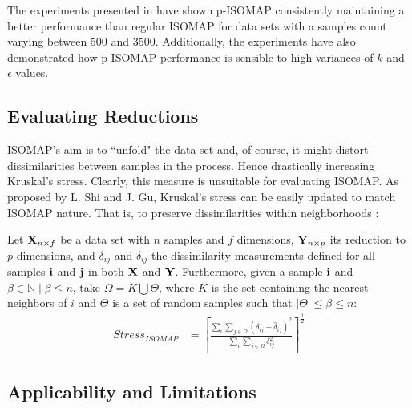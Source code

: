 The experiments presented in \cite{choo2010p} have shown p-ISOMAP consistently maintaining a better performance than regular ISOMAP for data sets with a samples count varying between 500 and 3500. Additionally, the experiments have also demonstrated how p-ISOMAP performance is sensible to high variances of $k$ and $\epsilon$ values.

\subsection{Evaluating Reductions}

ISOMAP's aim is to ``unfold" the data set and, of course, it might distort dissimilarities between samples in the process. Hence drastically increasing Kruskal's stress. Clearly, this measure is unsuitable for evaluating ISOMAP. As proposed by L. Shi and J. Gu, Kruskal's stress can be easily updated to match ISOMAP nature. That is, to preserve dissimilarities within neighborhoods \cite{shi2012fast}:

Let $\mathbf{X}_{n \times f}$ be a data set with $n$ samples and $f$ dimensions, $\mathbf{Y}_{n \times p}$ its reduction to $p$ dimensions, and $\delta_{ij}$ and $\hat{\delta}_{ij}$ the dissimilarity measurements defined for all samples $\mathbf{i}$ and $\mathbf{j}$ in both $\mathbf{X}$ and $\mathbf{Y}$. Furthermore, given a sample $\mathbf{i}$ and $\beta \in \mathbb{N} \mid \beta \le n$, take $\Omega=K \bigcup \Theta$, where $K$ is the set containing the nearest neighbors of $i$ and $\Theta$ is a set of random samples such that $|\Theta| \le \beta \le n$:
\begin{align*}
	Stress_{ISOMAP} &= [\frac{\sum_i \sum_{j \in \Omega} (\delta_{ij} - \hat{\delta}_{ij})^2}{\sum_i \sum_{j \in \Omega} \delta_{ij}^2}]^{\frac{1}{2}}
\end{align*}

\subsection{Applicability and Limitations}

